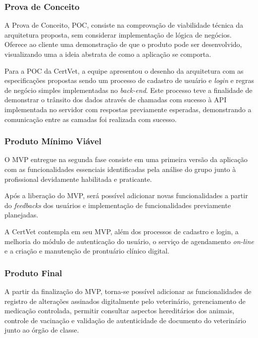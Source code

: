 \documentclass[
    12pt,               %
    openright,          %
    oneside,
    a4paper,            %
    BIBLATEX,           %
    TODO,               %
    english,            %
    brazil              %
    ]{ifsp-spo-inf-ctds}
\begin{document}
        \subsubsection{Prova de Conceito}
        
            A Prova de Conceito, POC, consiste na comprovação de viabilidade técnica da arquitetura proposta, sem considerar implementação de lógica de negócios. Oferece ao cliente uma demonstração de que o produto pode ser desenvolvido, visualizando uma a ideia abstrata de como a aplicação se comporta. 

            Para a POC da CertVet, a equipe apresentou o desenho da arquitetura com as especificações propostas sendo um processo de cadastro de usuário e \emph{login} e regras de negócio simples implementadas no \emph{back-end}. Este processo teve a finalidade de demonstrar o trânsito dos dados através de chamadas com sucesso à API implementada no servidor com respostas previamente esperadas, demonstrando a comunicação entre as camadas foi realizada com sucesso.
    
        \subsubsection{Produto Mínimo Viável}
        
            O MVP entregue na segunda fase consiste em uma primeira versão da aplicação com as funcionalidades essenciais identificadas pela análise do grupo junto à profissional devidamente habilitada e praticante.
            
            Após a liberação do MVP, será possível adicionar novas funcionalidades a partir do \emph{feedbacks} dos usuários e implementação de funcionalidades previamente planejadas.
            
            A CertVet contempla em seu MVP, além dos processos de cadastro e login, a melhoria do módulo de autenticação do usuário, o serviço de agendamento \emph{on-line} e a criação e manutenção de prontuário clínico digital.
        
        \subsubsection{Produto Final}
        
            A partir da finalização do MVP, torna-se possível adicionar as funcionalidades de registro de alterações assinados digitalmente pelo veterinário, gerenciamento de medicação controlada, permitir consultar aspectos hereditários dos animais, controle de vacinação e validação de autenticidade de documento do veterinário junto ao órgão de classe.
\end{document}
